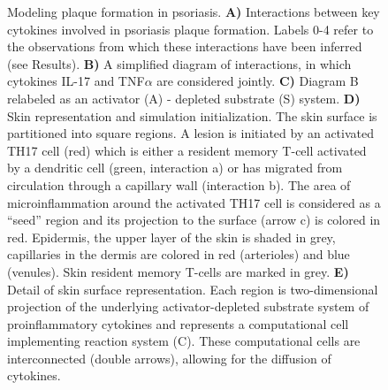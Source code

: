 \begin{figure}[p]
	\centering
	\caption{Modeling plaque formation in psoriasis. \textbf{A)} Interactions between key cytokines involved in psoriasis plaque formation. Labels 0-4 refer to the observations from which these interactions have been inferred (see Results). \textbf{B)} A simplified diagram of interactions, in which cytokines IL-17 and TNF$\alpha$ are considered jointly. \textbf{C)} Diagram B relabeled as an activator (A) - depleted substrate (S) system. \textbf{D)} Skin representation and simulation initialization. The skin surface is partitioned into square regions. A lesion is initiated by an activated TH17 cell (red) which is either a resident memory T-cell activated by a dendritic cell (green, interaction a) or has migrated from circulation through a capillary wall (interaction b). The area of microinflammation around the activated TH17 cell is considered as a “seed” region and its projection to the surface (arrow c) is colored in red.  Epidermis, the upper layer of the skin is shaded in grey, capillaries in the dermis are colored in red (arterioles) and blue (venules). Skin resident memory T-cells are marked in grey. \textbf{E)} Detail of skin surface representation. Each region is two-dimensional projection of the underlying activator-depleted substrate system of proinflammatory cytokines and represents a computational cell implementing reaction system (C). These computational cells are interconnected (double arrows), allowing for the diffusion of cytokines.}
	\label{fig:2}
\end{figure}

